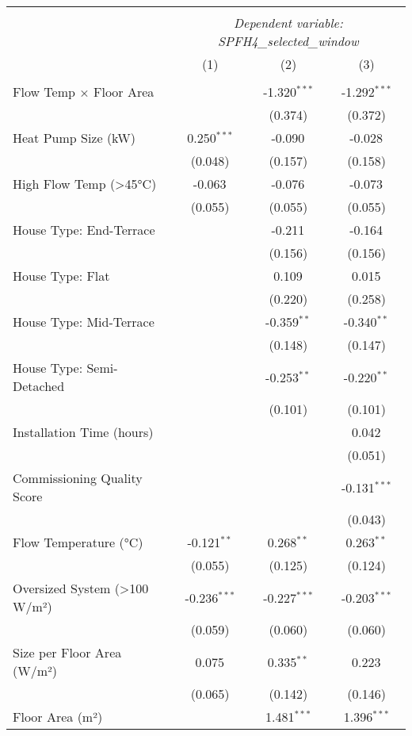 \documentclass{article}
\begin{document}
\begin{table}[!htbp] \centering
\begin{tabular}{@{\extracolsep{5pt}}lccc}
\\[-1.8ex]\hline
\hline \\[-1.8ex]
& \multicolumn{3}{c}{\textit{Dependent variable: SPFH4\_selected\_window}} \
\cr \cline{2-4}
\\[-1.8ex] & (1) & (2) & (3) \\
\hline \\[-1.8ex]
 Flow Temp × Floor Area & & -1.320$^{***}$ & -1.292$^{***}$ \\
& & (0.374) & (0.372) \\
 Heat Pump Size (kW) & 0.250$^{***}$ & -0.090$^{}$ & -0.028$^{}$ \\
& (0.048) & (0.157) & (0.158) \\
 High Flow Temp (>45°C) & -0.063$^{}$ & -0.076$^{}$ & -0.073$^{}$ \\
& (0.055) & (0.055) & (0.055) \\
 House Type: End-Terrace & & -0.211$^{}$ & -0.164$^{}$ \\
& & (0.156) & (0.156) \\
 House Type: Flat & & 0.109$^{}$ & 0.015$^{}$ \\
& & (0.220) & (0.258) \\
 House Type: Mid-Terrace & & -0.359$^{**}$ & -0.340$^{**}$ \\
& & (0.148) & (0.147) \\
 House Type: Semi-Detached & & -0.253$^{**}$ & -0.220$^{**}$ \\
& & (0.101) & (0.101) \\
 Installation Time (hours) & & & 0.042$^{}$ \\
& & & (0.051) \\
 Commissioning Quality Score & & & -0.131$^{***}$ \\
& & & (0.043) \\
 Flow Temperature (°C) & -0.121$^{**}$ & 0.268$^{**}$ & 0.263$^{**}$ \\
& (0.055) & (0.125) & (0.124) \\
 Oversized System (>100 W/m²) & -0.236$^{***}$ & -0.227$^{***}$ & -0.203$^{***}$ \\
& (0.059) & (0.060) & (0.060) \\
 Size per Floor Area (W/m²) & 0.075$^{}$ & 0.335$^{**}$ & 0.223$^{}$ \\
& (0.065) & (0.142) & (0.146) \\
 Floor Area (m²) & & 1.481$^{***}$ & 1.396$^{***}$ \\

\end{tabular}
\end{table}
\end{document}
